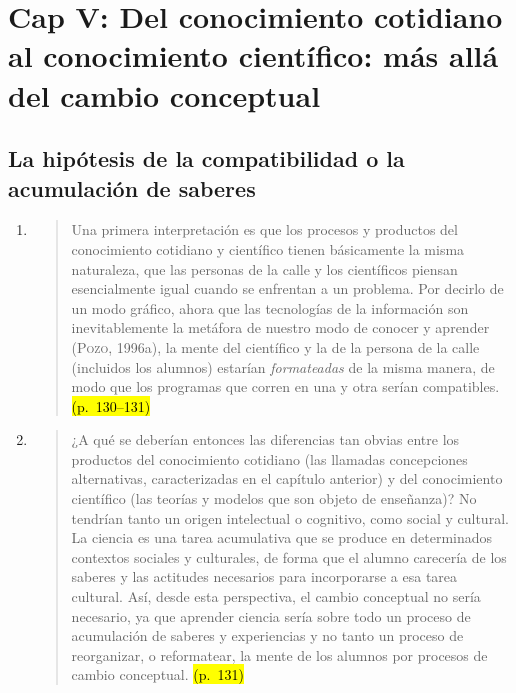 \documentclass{article}
\begin{document}
\tableofcontents  \vspace{2cm}


\section*{\textcolor{Tarawera}{ \textbf{ \textcolor{Mantle}{\textbf{Cap V:}} Del conocimiento cotidiano al conocimiento científico: más allá del cambio conceptual}}}


\subsection*{La hipótesis de la compatibilidad o la acumulación de saberes}

\begin{enumerate}
  \setcounter{enumi}{0}

  \item
  \begin{quote}
  Una primera interpretación es que los procesos y productos del conocimiento cotidiano y científico tienen básicamente la misma naturaleza, que las personas de la calle y los científicos piensan esencialmente igual cuando se enfrentan a un problema. Por decirlo de un modo gráfico, ahora que las tecnologías de la información son inevitablemente la metáfora de nuestro modo de conocer y aprender (\textsc{Pozo}, 1996a), la mente del científico y la de la persona de la calle (incluidos los alumnos) estarían \textit{formateadas} de la misma manera, de modo que los programas que corren en una y otra serían compatibles. \hl{(p.~130–131)}
  \end{quote}

  \item
  \begin{quote}
  ¿A qué se deberían entonces las diferencias tan obvias entre los productos del conocimiento cotidiano (las llamadas concepciones alternativas, caracterizadas en el capítulo anterior) y del conocimiento científico (las teorías y modelos que son objeto de enseñanza)? No tendrían tanto un origen intelectual o cognitivo, como social y cultural. La ciencia es una tarea acumulativa que se produce en determinados contextos sociales y culturales, de forma que el alumno carecería de los saberes y las actitudes necesarios para incorporarse a esa tarea cultural. Así, desde esta perspectiva, el cambio conceptual no sería necesario, ya que aprender ciencia sería sobre todo un proceso de acumulación de saberes y experiencias y no tanto un proceso de reorganizar, o reformatear, la mente de los alumnos por procesos de cambio conceptual. \hl{(p.~131)}
  \end{quote}
\end{enumerate}
\end{document}
